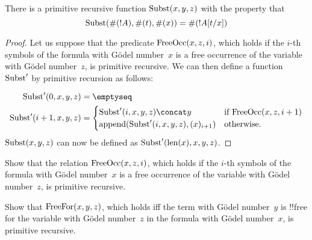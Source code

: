 \documentclass[../../../include/open-logic-section]{subfiles}
\begin{document}

\begin{prop}
There is a primitive recursive function $\mathrm{Subst}(x, y, z)$ with the property that
\[
\mathrm{Subst}(\#(!A), \#(t), \#(x)) = \#(!A[t/x])
\]
\end{prop}

\begin{proof}
Let us suppose that the predicate $\mathrm{FreeOcc}(x, z, i)$, which holds
if the $i$-th symbols of the formula with G\"odel number~$x$ is a free
occurrence of the variable with G\"odel number~$z$, is primitive
recursive.  We can then define a function $\mathrm{Subst}'$ by primitive
recursion as follows:

\begin{align*}
\fn{Subst}'(0, x, y, z) & = \emptyseq \\
\fn{Subst}'(i + 1, x, y, z) & =
\begin{cases}
\fn{Subst}'(i, x, y, z) \concat y & \text{if $\fn{FreeOcc}(x, z, i+1)$} \\
\fn{append}(\fn{Subst}'(i, x, y, z), (x)_{i+1}) & \text{otherwise.}
\end{cases}
\end{align*}
$\mathrm{Subst}(x, y, z)$ can now be defined as $\mathrm{Subst}'(\mathrm{len}(x), x, y, z)$.
\end{proof}

\begin{prob}
Show that the relation $\mathrm{FreeOcc}(x, z, i)$, which holds if the
$i$-th symbols of the formula with G\"odel number~$x$ is a free
occurrence of the variable with G\"odel number~$z$, is primitive
recursive.
\end{prob}

\begin{prob}
Show that $\mathrm{FreeFor}(x, y, z)$, which holds iff the term with
G\"odel number~$y$ is !!{free for} the variable with G\"odel
number~$z$ in the formula with G\"odel number~$x$, is primitive
recursive.
\end{prob}
\end{document}
